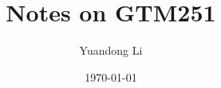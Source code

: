 \documentclass[a4paper,11pt]{article}
\title{Notes on GTM251}
\author{Yuandong Li}
\date{\today}
\begin{document}
\maketitle

\tableofcontents
\newpage






\def\ChapOne{chap1}
 

\clearpage

\def\ChapTwo{chap2}
 

\clearpage

\def\ChapThree{chap3}
 

\clearpage
\end{document}

